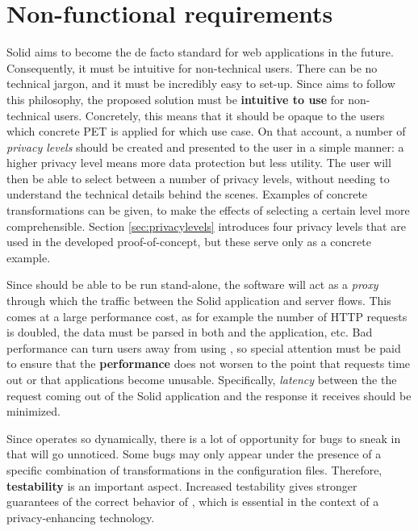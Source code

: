 \section{Non-functional requirements}
Solid aims to become the de facto standard for web applications in the future. Consequently, it must be intuitive for non-technical users. There can be no technical jargon, and it must be incredibly easy to set-up. Since \middleware{} aims to follow this philosophy, the proposed solution must be \textbf{intuitive to use} for non-technical users. Concretely, this means that it should be opaque to the users which concrete PET is applied for which use case. On that account, a number of \textit{privacy levels} should be created and presented to the user in a simple manner: a higher privacy level means more data protection but less utility. The user will then be able to select between a number of privacy levels, without needing to understand the technical details behind the scenes. Examples of concrete transformations can be given, to make the effects of selecting a certain level more comprehensible. Section \ref{sec:privacylevels} introduces four privacy levels that are used in the developed proof-of-concept, but these serve only as a concrete example. 

Since \middleware{} should be able to be run stand-alone, the software will act as a \textit{proxy} through which the traffic between the Solid application and server flows. This comes at a large performance cost, as for example the number of HTTP requests is doubled, the data must be parsed in both \middleware{} and the application, etc. Bad performance can turn users away from using \middleware{}, so special attention must be paid to ensure that the \textbf{performance} does not worsen to the point that requests time out or that applications become unusable. Specifically, \textit{latency} between the the request coming out of the Solid application and the response it receives should be minimized.

Since \middleware{} operates so dynamically, there is a lot of opportunity for bugs to sneak in that will go unnoticed. Some bugs may only appear under the presence of a specific combination of transformations in the configuration files. Therefore, \textbf{testability} is an important aspect. Increased testability gives stronger guarantees of the correct behavior of \middleware{}, which is essential in the context of a privacy-enhancing technology.  


